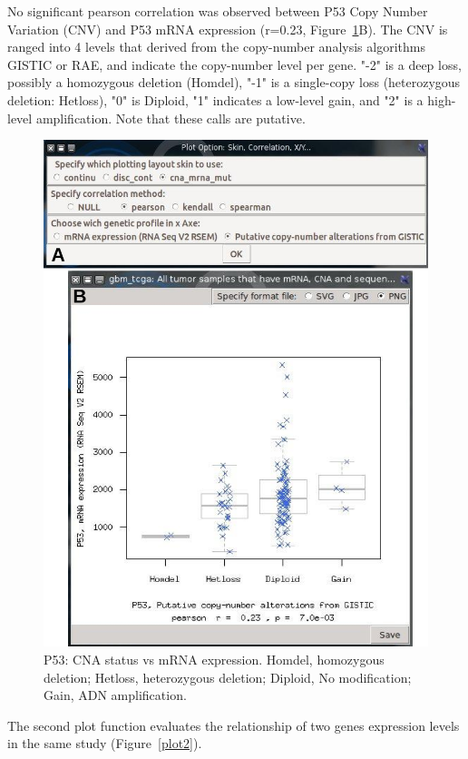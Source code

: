 \documentclass[a4paper]{article}
\begin{document}
No significant pearson correlation was observed between P53 Copy Number Variation (CNV) and P53 mRNA expression (r=0.23, Figure~\ref{plot1}B). The CNV is ranged into 4 levels that derived from the copy-number analysis algorithms GISTIC or RAE, and indicate the copy-number level per gene. "-2" is a deep loss, possibly a homozygous deletion (Homdel), "-1" is a single-copy loss (heterozygous deletion: Hetloss), "0" is Diploid, "1" indicates a low-level gain, and "2" is a high-level amplification. Note that these calls are putative.


\begin{figure}[!ht]
  \centering
 \includegraphics[scale=0.5]{image/plot1.png}
 \caption{P53: CNA status vs mRNA expression. Homdel, homozygous deletion; Hetloss, heterozygous deletion; Diploid, No modification; Gain, ADN amplification.}
 \label{plot1}
 \end{figure}
 
 The second plot function evaluates the relationship of two genes expression levels in the same study (Figure~\ref{plot2}). 
 
\end{document}
